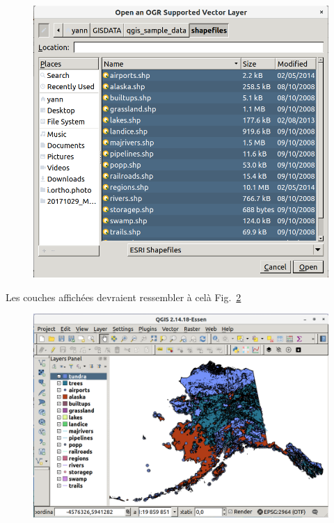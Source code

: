 \begin{figure}[htbp]
   \centering
   \includegraphics[scale=0.28]{qgis002.png}
   \caption{}
   \label{fig:qgis002}
\end{figure}

Les couches affich\'ees devraient ressembler \`a cel\`a Fig.~\ref{fig:qgis003}

\begin{figure}[htbp]
   \centering
   \includegraphics[scale=0.22]{qgis003.png}
   \caption{}
   \label{fig:qgis003}
\end{figure}

